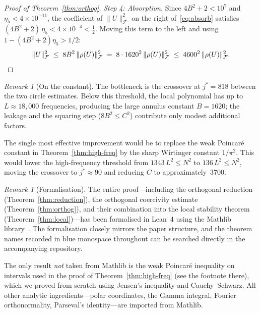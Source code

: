 \documentclass[11pt]{amsart}
\theoremstyle{definition}
\theoremstyle{remark}
\newtheorem{remark}[theorem]{Remark}
\begin{document}
\begin{proof}[Proof of Theorem~\ref{thm:orthog}]
\medskip
\noindent
\emph{Step 4: Absorption.}\;
Since $4B^2 + 2 < 10^7$ and $\eta_5 < 4 \times 10^{-11}$, the coefficient
of $\lVert U \rVert_\mathcal{F}^2$ on the right of~\eqref{eq:absorb} satisfies
$(4B^2 + 2)\,\eta_5 < 4 \times 10^{-4} < \tfrac{1}{2}$.
Moving this term to the left and using $1 - (4B^2+2)\eta_5 > 1/2$:
\[
\lVert U \rVert_\mathcal{F}^2
\;\le\; 8B^2\,\lVert \rho(U) \rVert_\mathcal{F}^2
\;=\; 8 \cdot 1620^2\,\lVert \rho(U) \rVert_\mathcal{F}^2
\;\le\; 4600^2\,\lVert \rho(U) \rVert_\mathcal{F}^2.\qedhere
\]
\end{proof}

\begin{remark}[On the constant]
The bottleneck is the crossover at $j^* = 818$ between the two circle
estimates.  Below this threshold, the local polynomial has up to
$L \approx 18{,}000$ frequencies, producing the large annulus constant
$B = 1620$; the leakage and the squaring step ($8B^2 \le C^2$) contribute
only modest additional factors.

The single most effective improvement would be to replace the weak
Poincar\'e constant in Theorem~\ref{thm:high-freq} by the sharp Wirtinger
constant $1/\pi^2$.  This would lower the high-frequency threshold from
$1343\,L^2 \le N^2$ to $136\,L^2 \le N^2$, moving the crossover to
$j^* \approx 90$ and reducing $C$ to approximately~$3700$.
\end{remark}

\begin{remark}[Formalisation]
The entire proof---including the orthogonal reduction
(Theorem~\ref{thm:reduction}), the orthogonal coercivity estimate
(Theorem~\ref{thm:orthog}), and their combination into the local stability
theorem (Theorem~\ref{thm:local})---has been formalised in Lean~4 using the
Mathlib library~\cite{mathlib}.  The formalisation closely mirrors the paper
structure, and the theorem names recorded in blue monospace
throughout can be searched directly in the accompanying repository.

The only result \emph{not} taken from Mathlib is the weak Poincar\'e
inequality on intervals used in the proof of
Theorem~\ref{thm:high-freq} (see the footnote there), which we proved
from scratch using Jensen's inequality and Cauchy--Schwarz.
All other analytic ingredients---polar coordinates, the Gamma integral,
Fourier orthonormality, Parseval's identity---are imported from Mathlib.
\end{remark}
 
\end{document}
